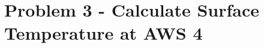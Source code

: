 \documentclass[11pt]{article}
\begin{document}
    \begin{center}
    \end{center}
    { \hspace*{\fill} \\}
    
    \begin{center}
    \end{center}
    { \hspace*{\fill} \\}
    
    \begin{center}
    \end{center}
    { \hspace*{\fill} \\}
    
    \begin{center}
    \end{center}
    { \hspace*{\fill} \\}
    
    \begin{center}
    \end{center}
    { \hspace*{\fill} \\}
    
    \section{Problem 3 - Calculate Surface Temperature at AWS
4}\label{problem-3---calculate-surface-temperature-at-aws-4}
\end{document}
